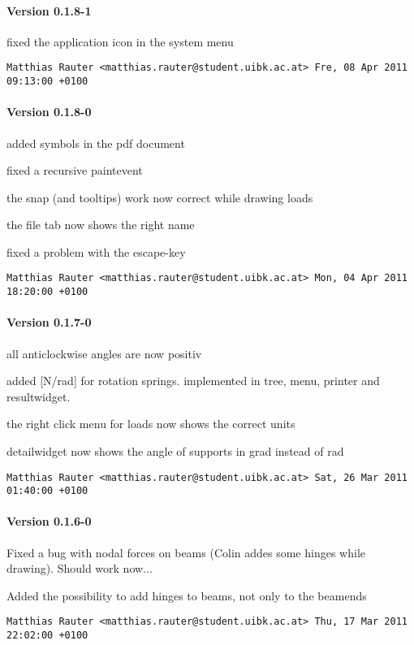 \paragraph{Version 0.1.8-1}
\begin{compactitem}
\item fixed the application icon in the system menu
\end{compactitem}
\texttt{Matthias Rauter <matthias.rauter@student.uibk.ac.at>  Fre, 08 Apr 2011 09:13:00 +0100}
\paragraph{Version 0.1.8-0}
\begin{compactitem}
\item added symbols in the pdf document
\item fixed a recursive paintevent
\item the snap (and tooltips) work now correct while drawing loads
\item the file tab now shows the right name
\item fixed a problem with the escape-key
\end{compactitem}
\texttt{Matthias Rauter <matthias.rauter@student.uibk.ac.at>  Mon, 04 Apr 2011 18:20:00 +0100}
\paragraph{Version 0.1.7-0}
\begin{compactitem}
\item all anticlockwise angles are now positiv
\item added [N/rad] for rotation springs. implemented in tree, menu, printer and resultwidget.
\item the right click menu for loads now shows the correct units
\item detailwidget now shows the angle of supports in grad instead of rad
\end{compactitem}
\texttt{Matthias Rauter <matthias.rauter@student.uibk.ac.at>  Sat, 26 Mar 2011 01:40:00 +0100}
\paragraph{Version 0.1.6-0}
\begin{compactitem}
\item Fixed a bug with nodal forces on beams (Colin addes some hinges while drawing). Should work now...
\item Added the possibility to add hinges to beams, not only to the beamends
\end{compactitem}
\texttt{Matthias Rauter <matthias.rauter@student.uibk.ac.at>  Thu, 17 Mar 2011 22:02:00 +0100}

